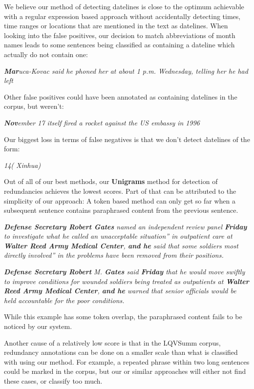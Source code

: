 \documentclass[a4paper,10pt]{scrartcl}
\theoremstyle{style}
\begin{document}
We believe our method of detecting datelines is close to the optimum achievable with a regular expression based approach without accidentally detecting times, time ranges or locations that are mentioned in the text as datelines.
When looking into the false positives, our decision to match abbreviations of month names leads to some sentences being classified as containing a dateline which actually do not contain one:

\quad\textit{\textbf{Mar}uca-Kovac said he phoned her at about 1 p.m. Wednesday, telling her he had left}

Other false positives could have been annotated as containing datelines in the corpus, but weren't:

\quad\textit{\textbf{Nov}ember 17 itself fired a rocket against the US embassy in 1996}

Our biggest loss in terms of false negatives is that we don't detect datelines of the form:

\quad\textit{14( Xinhua)}

Out of all of our best methods, our \textbf{Unigrams} method for detection of redundancies achieves the lowest scores. Part of that can be attributed to the simplicity of our approach: A token based method can only get so far when a subsequent sentence contains paraphrased content from the previous sentence.

\quad\textit{\textbf{Defense Secretary Robert Gates} named an independent review panel \textbf{Friday} to investigate what he called an unacceptable situation'' in outpatient care at \textbf{Walter Reed Army Medical Center}, \textbf{and he} said that some soldiers most directly involved'' in the problems have been removed from their positions.}

\quad\textit{\textbf{Defense Secretary Robert} M. \textbf{Gates} said \textbf{Friday} that he would move swiftly to improve conditions for wounded soldiers being treated as outpatients at \textbf{Walter Reed Army Medical Center}, \textbf{and he} warned that senior officials would be held accountable for the poor conditions.}

While this example has some token overlap, the paraphrased content fails to be noticed by our system.

Another cause of a relatively low score is that in the LQVSumm corpus, redundancy annotations can be done on a smaller scale than what is classified with using our method. For example, a repeated phrase within two long sentences could be marked in the corpus, but our or similar approaches will either not find these cases, or classify too much.
\end{document}
